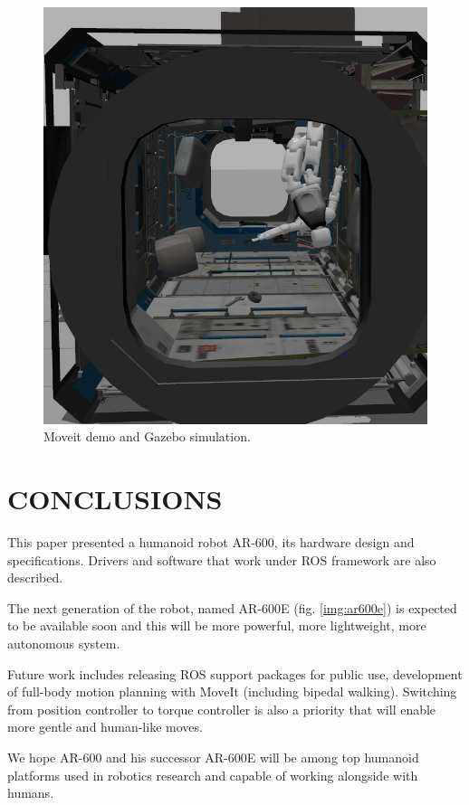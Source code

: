 \documentclass[letterpaper, 10 pt, conference]{ieeeconf}  %
\begin{document}
\begin{figure}[thpb]
{\begin{minipage}[h]{0.49\linewidth}
\includegraphics[scale=.155]{gazebo}
\end{minipage}
}
\caption{Moveit demo and Gazebo simulation.}
\label{img:moveitgazebo}
\end{figure}

\section{CONCLUSIONS}

This paper presented a humanoid robot AR-600, its hardware design and
specifications. Drivers and software that work under ROS framework are
also described.

The next generation of the robot, named AR-600E (fig. \ref{img:ar600e}) is
expected to be available soon and this will be more powerful, more lightweight,
more autonomous system.

Future work includes releasing ROS support packages for public use, development
of full-body motion planning with MoveIt (including bipedal walking). Switching
from position controller to torque controller is also a priority that
will enable more gentle and human-like moves. 

We hope AR-600 and his successor AR-600E will be among top humanoid platforms
used in robotics research and capable of working alongside with humans.
\end{document}

